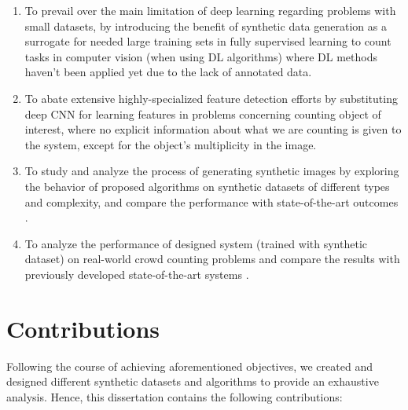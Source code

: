 \begin{enumerate}

\item To prevail over the main limitation of deep learning regarding problems with small datasets, by introducing the benefit of synthetic data generation as a surrogate for needed large training sets in fully supervised learning to count tasks in computer vision (when using DL algorithms) where DL methods haven't been applied yet due to the lack of annotated data.

\item To abate extensive highly-specialized feature detection efforts by substituting deep CNN for learning features in problems concerning counting object of interest, where no explicit information about what we are counting is given to the system, except for the object's multiplicity in the image.


\item To study and analyze the process of generating synthetic images by exploring the behavior of proposed algorithms on synthetic datasets of different types and complexity, and compare the performance with state-of-the-art outcomes \cite{segui2015learning}. 


\item To analyze the performance of designed system (trained with synthetic dataset) on real-world crowd counting problems and compare the results with previously developed state-of-the-art systems \cite{chan2008privacy}.   
 

\end{enumerate}
\section{Contributions}
Following the course of achieving aforementioned objectives, we created and designed different synthetic datasets and algorithms to provide an exhaustive analysis. Hence, this dissertation contains the following contributions: 


